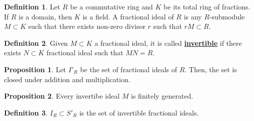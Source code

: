 \documentclass{article}
\theoremstyle{definition}
\theoremstyle{definition}
\theoremstyle{definition}
\newtheorem{proposition}{Proposition}[section]
\theoremstyle{definition}
\theoremstyle{definition}
\newtheorem{definition}{Definition}[section]
\theoremstyle{definition}
\theoremstyle{definition}
\begin{document}
    



\begin{tcolorbox}[colback=purple!5!white,colframe=purple!75!black]
\begin{definition}
Let $R$ be a commutative ring and $K$ be its total ring of fractions. If $R$ is a domain, then $K$ is a field. A fractional ideal of $R$ is any $R$-submodule $M\subset K$ such that there exists non-zero divisor $r$ such that $rM\subset R$. 
\end{definition}
\end{tcolorbox}


\begin{tcolorbox}[colback=purple!5!white,colframe=purple!75!black]
\begin{definition}
Given $M\subset K$ a fractional ideal, it is called \underline{\textbf{invertible}} if there exists $N\subset K$ fractional ideal such that $MN=R$.
\end{definition}
\end{tcolorbox}


\begin{tcolorbox}[colback=blue!5!white,colframe=blue!30!white]
\begin{proposition}
Let $I'_R$ be the set of fractional ideals of $R$. Then, the set is closed under addition and multiplication. 
\end{proposition}
\end{tcolorbox}



\begin{tcolorbox}[colback=blue!5!white,colframe=blue!30!white]
\begin{proposition}
Every invertibe ideal $M$ is finitely generated. 
\end{proposition}
\end{tcolorbox}


\begin{tcolorbox}[colback=purple!5!white,colframe=purple!75!black]
\begin{definition}
$I_R\subset S'_R$ is the set of invertible fractional ideals.
\end{definition}
\end{tcolorbox}
\end{document}
